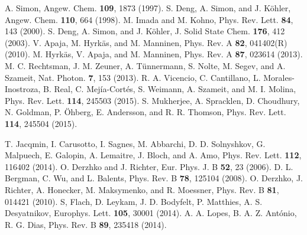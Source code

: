 \documentclass[twocolumn,showpacs,epsfig,pre]{revtex4}
\begin{document}
\begin{thebibliography}{150}
 A. Simon, Angew. Chem. {\bf 109}, 1873 (1997).
 S. Deng, A. Simon, and J. K{\"o}hler, Angew. Chem. {\bf 110}, 664 (1998).
 M. Imada and M. Kohno, Phys. Rev. Lett. {\bf 84}, 143 (2000).
 S. Deng, A. Simon, and J. K{\"o}hler, J. Solid State Chem. {\bf 176}, 412 (2003).
 V. Apaja, M. Hyrk{\"a}s, and M. Manninen, Phys. Rev. A {\bf 82}, 041402(R) (2010).
 M. Hyrk{\"a}s, V. Apaja, and M. Manninen, Phys. Rev. A {\bf 87}, 023614 (2013).
 M. C. Rechtsman, J. M. Zeuner, A. T{\"u}nnermann, S. Nolte, M. Segev, and A. Szameit, Nat. Photon. {\bf 7}, 153 (2013).
 R. A. Vicencio, C. Cantillano, L. Morales-Inostroza, B. Real, C. Mej{\'i}a-Cort{\'e}s, S. Weimann, A. Szameit, and M. I. Molina, Phys. Rev. Lett. {\bf 114}, 245503 (2015).
 S. Mukherjee, A. Spracklen, D. Choudhury, N. Goldman, P. {\"O}hberg, E. Andersson, and R. R. Thomson, Phys. Rev. Lett. {\bf 114}, 245504 (2015).

 T. Jacqmin, I. Carusotto, I. Sagnes, M. Abbarchi, D. D. Solnyshkov, G. Malpuech, E. Galopin, A. Lemaitre, J. Bloch, and A. Amo, Phys. Rev. Lett. {\bf 112}, 116402 (2014).
 O. Derzhko and J. Richter, Eur. Phys. J. B {\bf 52}, 23 (2006).
 D. L. Bergman, C. Wu, and L. Balents, Phys. Rev. B {\bf 78}, 125104 (2008).
 O. Derzhko, J. Richter, A. Honecker, M. Maksymenko, and R. Moessner, Phys. Rev. B {\bf 81}, 014421 (2010).
 S, Flach, D. Leykam, J. D. Bodyfelt, P. Matthies, A. S. Desyatnikov, Europhys. Lett. {\bf 105}, 30001 (2014).
 A. A. Lopes, B. A. Z. Ant{\' o}nio, R. G. Dias, Phys. Rev. B {\bf 89}, 235418 (2014).

\end{thebibliography}
\end{document}
